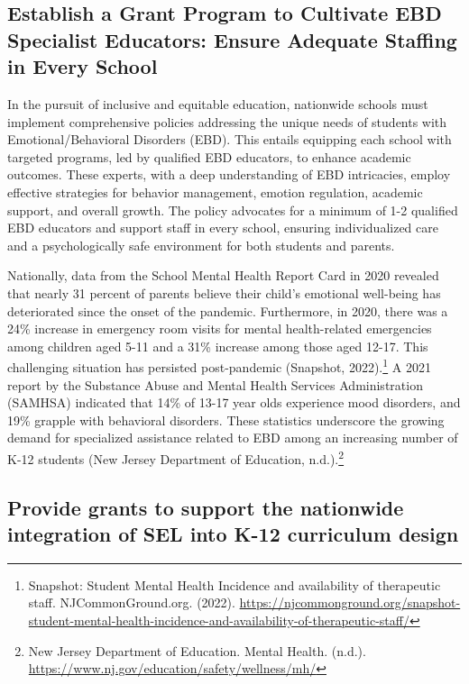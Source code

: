 \documentclass[11pt]{article}
\begin{document}
\subsection{Establish a Grant Program to Cultivate EBD Specialist Educators: Ensure Adequate Staffing in Every School}

In the pursuit of inclusive and equitable education, nationwide schools must implement comprehensive policies addressing the unique needs of students with Emotional/Behavioral Disorders (EBD). This entails equipping each school with targeted programs, led by qualified EBD educators, to enhance academic outcomes. These experts, with a deep understanding of EBD intricacies, employ effective strategies for behavior management, emotion regulation, academic support, and overall growth. The policy advocates for a minimum of 1-2 qualified EBD educators and support staff in every school, ensuring individualized care and a psychologically safe environment for both students and parents.

Nationally, data from the School Mental Health Report Card in 2020 revealed that nearly 31 percent of parents believe their child's emotional well-being has deteriorated since the onset of the pandemic. Furthermore, in 2020, there was a 24\% increase in emergency room visits for mental health-related emergencies among children aged 5-11 and a 31\% increase among those aged 12-17. This challenging situation has persisted post-pandemic (Snapshot, 2022).\footnote{Snapshot: Student Mental Health Incidence and availability of therapeutic staff. NJCommonGround.org. (2022). \url{https://njcommonground.org/snapshot-student-mental-health-incidence-and-availability-of-therapeutic-staff/}} A 2021 report by the Substance Abuse and Mental Health Services Administration (SAMHSA) indicated that 14\% of 13-17 year olds experience mood disorders, and 19\% grapple with behavioral disorders. These statistics underscore the growing demand for specialized assistance related to EBD among an increasing number of K-12 students (New Jersey Department of Education, n.d.).\footnote{New Jersey Department of Education. Mental Health. (n.d.). \url{https://www.nj.gov/education/safety/wellness/mh/}}

\subsection{Provide grants to support the nationwide integration of SEL into K-12 curriculum design}
\end{document}
